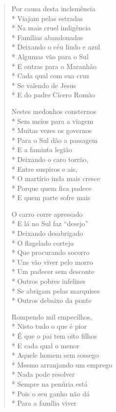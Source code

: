 \begin{verse}
Por causa desta inclemência\\*
Viajam pelas estradas\\*
Na mais cruel indigência\\*
Famílias abandonadas\\*
Deixando o céu lindo e azul\\*
Algumas vão para o Sul\\*
E outras para o Maranhão\\*
Cada qual com sua cruz\\*
Se valendo de Jesus\\*
E do padre Cícero Romão

Nestes medonhos consternos\\*
Sem meios para a viagem\\*
Muitas vezes os governos\\*
Para o Sul dão a passagem\\*
E a faminta legião\\*
Deixando o caro torrão,\\*
Entre suspiros e ais,\\*
O martírio inda mais cresce\\*
Porque quem fica padece\\*
E quem parte sofre mais

O carro corre apressado\\*
E lá no Sul faz “desejo”\\*
Deixando desabrigado\\*
O flagelado cortejo\\*
Que procurando socorro\\*
Uns vão viver pelo morro\\*
Um padecer sem desconte\\*
Outros pobres infelizes\\*
Se abrigam pelas marquises\\*
Outros debaixo da ponte

Rompendo mil empecilhos,\\*
Nisto tudo o que é pior\\*
É que o pai tem oito filhos\\*
E cada qual o menor\\*
Aquele homem sem sossego\\*
Mesmo arranjando um emprego\\*
Nada pode resolver\\*
Sempre na penúria está\\*
Pois o seu ganho não dá\\*
Para a família viver


\end{verse}
